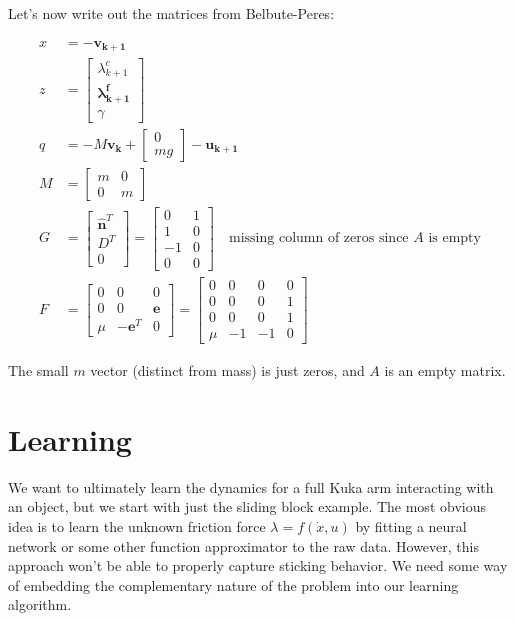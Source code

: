 \documentclass{article}
\renewcommand{\vec}[1]{\boldsymbol{#1}}
\newcommand{\rvec}[1]{\begin{bmatrix} #1 \end{bmatrix}}
\begin{document}
Let's now write out the matrices from Belbute-Peres:

\begin{align*}
    x &= -\vec{v_{k+1}} \\
    z &= \rvec{\lambda^c_{k+1} \\ \vec{\lambda^f_{k+1}} \\ \gamma} \\
    q &= - M \vec{v_k} + \rvec{0 \\ m g} - \vec{u_{k+1}} \\
    M &=
    \begin{bmatrix}
        m & 0 \\
        0 & m
    \end{bmatrix} \\
    G &= 
    \begin{bmatrix}
        \vec{\hat n}^T \\
        D^T \\
        0
    \end{bmatrix} 
    =
    \begin{bmatrix}
        0 & 1 \\
        1 & 0 \\
        -1 & 0 \\
        0 & 0
    \end{bmatrix} \quad \textrm{missing column of zeros since $A$ is empty} \\
    F &=
    \begin{bmatrix}
        0 & 0 & 0 \\
        0 & 0 & \vec{e} \\
        \mu & -\vec{e}^T & 0
    \end{bmatrix}
    =
    \begin{bmatrix}
        0 & 0 & 0 & 0 \\
        0 & 0 & 0 & 1 \\
        0 & 0 & 0 & 1 \\
        \mu & -1 & -1 & 0
    \end{bmatrix}
\end{align*}

The small $m$ vector (distinct from mass) is just zeros, and $A$ is an empty matrix.

\section{Learning}
We want to ultimately learn the dynamics for a full Kuka arm interacting with an object, but we start with just the sliding block example. The most obvious idea is to learn the unknown friction force $\lambda = f(\dot x, u)$ by fitting a neural network or some other function approximator to the raw data. However, this approach won't be able to properly capture sticking behavior. We need some way of embedding the complementary nature of the problem into our learning algorithm. 
\end{document}
